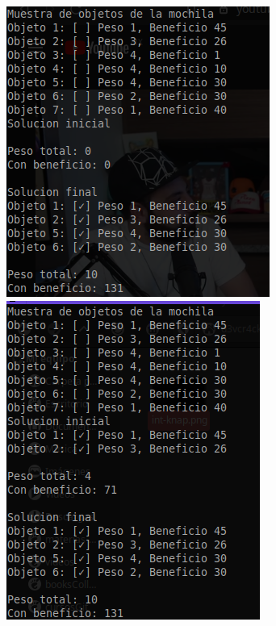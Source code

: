 \documentclass[10pt]{article}
\begin{document}
\begin{center}
  \includegraphics[scale=0.5]{imgs/k_sol-1.png}\\
  \includegraphics[scale=0.5]{imgs/k_sol-2.png}
\end{center}
\end{document}
